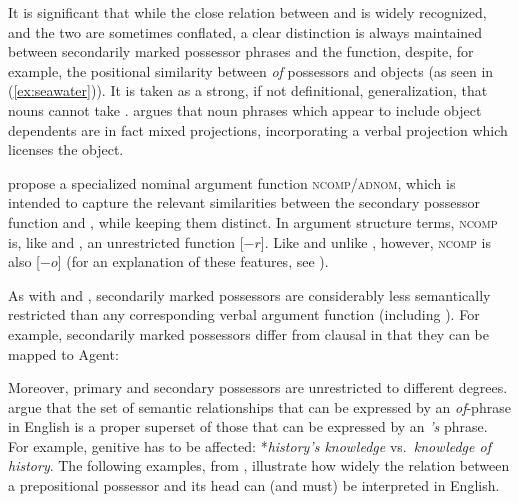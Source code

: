 \documentclass[output=paper,hidelinks]{langscibook}
\begin{document}
It is significant that while the close relation between {\POSS} and {\SUBJ} is widely recognized, and the two are sometimes conflated, a clear distinction is always maintained between secondarily marked possessor phrases and the {\OBJ} function, despite, for example, the positional similarity between \emph{of} possessors and objects (as seen in (\ref{ex:seawater})). It is taken as a strong, if not definitional, generalization, that nouns cannot take {\OBJ} \citep{bresnan1989locative, BresMosh90,BresMuga06, ChisaPayn01, ChisaPayn03, Lowe17, Lowe19b}. \citet{Lowe17,Lowe19b} argues that noun phrases which appear to include object dependents are in fact mixed projections, incorporating a verbal projection which licenses the object.

\citet{ChisaPayn01, ChisaPayn03} propose a specialized nominal argument function \textsc{ncomp}/\textsc{adnom}, which is intended to capture the relevant similarities between the secondary possessor function and {\OBJ}, while keeping them distinct. In argument structure terms, \textsc{ncomp} is, like {\SUBJ} and {\OBJ}, an unrestricted function [$-r$]. Like {\SUBJ} and unlike {\OBJ}, however, \textsc{ncomp} is also [$-o$] (for an explanation of these features, see ). 

As with {\POSS} and {\SUBJ}, secondarily marked possessors are considerably less semantically restricted than any corresponding verbal argument function (including {\OBJ}). For example, secondarily marked possessors differ from clausal {\OBJ} in that they can be mapped to Agent:

\eal
{}
\zl

Moreover, primary and secondary possessors are unrestricted to different degrees.  \citet[473--478]{PaynHudd02} argue that the set of semantic relationships that can be expressed by an \emph{of}-phrase in English is a proper superset of those that can be expressed by an \emph{'s} phrase. For example, genitive {\POSS} has to be affected: *\emph{history's knowledge} vs.\ \emph{knowledge of history}. The following examples, from \citet[809]{Payneetal13}, illustrate how widely the relation between a prepositional possessor and its head can (and must) be interpreted in English.


\eal
{}
\zl
\end{document}
